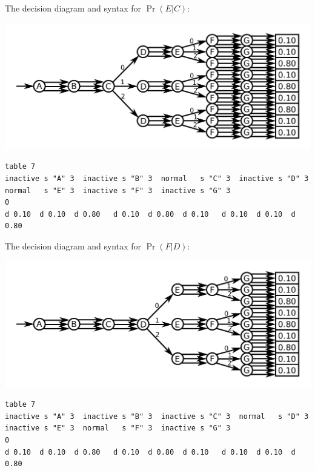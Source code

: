 \documentclass{article}
\begin{document}
\vspace{5mm}

\begin{minipage}{\textwidth}
The decision diagram and syntax for \(\Pr(E|C)\):

\includegraphics[width = \textwidth]{Pr(E)}

\begin{verbatim}
table 7 
inactive s "A" 3  inactive s "B" 3  normal   s "C" 3  inactive s "D" 3 
normal   s "E" 3  inactive s "F" 3  inactive s "G" 3 
0 
d 0.10  d 0.10  d 0.80   d 0.10  d 0.80  d 0.10   d 0.10  d 0.10  d 0.80 
\end{verbatim}
\end{minipage}

\vspace{5mm}

\begin{minipage}{\textwidth}
The decision diagram and syntax for \(\Pr(F|D)\):

\includegraphics[width = \textwidth]{Pr(F)}

\begin{verbatim}
table 7 
inactive s "A" 3  inactive s "B" 3  inactive s "C" 3  normal   s "D" 3 
inactive s "E" 3  normal   s "F" 3  inactive s "G" 3 
0 
d 0.10  d 0.10  d 0.80   d 0.10  d 0.80  d 0.10   d 0.10  d 0.10  d 0.80 
\end{verbatim}
\end{minipage}
\end{document}
